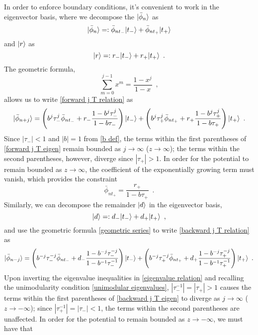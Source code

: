 \documentclass[submission, Phys]{SciPost}
\newcommand{\lp}{\left(}
\newcommand{\rp}{\right)}
\DeclarePairedDelimiter\ket{\lvert}{\rangle}
\begin{document}
In order to enforce boundary conditions, it's convenient to work in the eigenvector basis, where we decompose the $\ket{\bar\phi_n}$ as
\begin{equation}
    \label{eigen decomp phi}
    \ket{\bar\phi_n}=:\bar\phi_{n t_-}\ket{t_-} + \bar\phi_{nt_+}\ket{t_+}
\end{equation}
and $\ket r$ as
\begin{equation}
    \label{eigen decomp r}
    \ket r =: r_-\ket{t_-}+r_+\ket{t_+}
    \,\,\,.
\end{equation}
The geometric formula,
\begin{equation}
    \label{geometric series}
    \sum_{m=0}^{j-1} x^m = \frac{1-x^j}{1-x}
    \,\,\,,
\end{equation}
allows us to write \eqref{forward j T relation} as
\begin{equation}
    \label{forward j T eigen}
    \ket{\bar\phi_{n+j}} = 
    \lp 
    b^j \tau_-^j\bar\phi_{nt_-} + r_-\frac{1-b^j\tau_-^j}{1-b\tau_-}
    \rp\ket{t_-}
    +
    \lp
    b^j\tau_+^j\bar\phi_{nt_+}+r_+\frac{1-b^j\tau_+^j}{1-b\tau_+}
    \rp\ket{t_+}
    \,\,\,.
\end{equation}
Since $|\tau_-|<1$ and $|b|=1$ from \eqref{b def}, the terms within the first parentheses of \eqref{forward j T eigen} remain bounded as $j\to\infty$ ($z\to\infty$); the terms within the second parentheses, however, diverge since $|\tau_+|>1$.  In order for the potential to remain bounded as $z\to\infty$, the coefficient of the exponentially growing term must vanish, which provides the constraint
\begin{equation}
    \label{forward BC}
    \bar\phi_{nt_+}=\frac{r_+}{1-b\tau_+}
    \,\,\,.
\end{equation}
Similarly, we can decompose the remainder $\ket d$ in the eigenvector basis,
\begin{equation}
    \label{eigen decomp d}
    \ket d=:d_-\ket{t_-} + d_+\ket{t_+}
    \,\,\,,
\end{equation}
and use the geometric formula \eqref{geometric series} to write \eqref{backward j T relation} as
\begin{equation}
    \label{backward j T eigen}
    \ket{\bar\phi_{n-j}} = 
    \lp
    b^{-j}\tau_-^{-j}\bar\phi_{nt_-} + d_- \frac{1-b^{-j}\tau_-^{-j}}{1-b^{-1}\tau_-^{-1}}
    \rp
    \ket{t_-}
    +
    \lp
    b^{-j}\tau_+^{-j}\bar\phi_{nt_+}
    +
    d_+\frac{1-b^{-j}\tau_+^{-j}}{1-b^{-1}\tau_+^{-1}}
    \rp
    \ket{t_+}
    \,\,\,.
\end{equation}
Upon inverting the eigenvalue inequalities in \eqref{eigenvalue relation} and recalling the unimodularity condition \eqref{unimodular eigenvalues}, $|\tau_-^{-1}|=|\tau_+|>1$ causes the terms within the first parentheses of \eqref{backward j T eigen} to diverge as $j\to\infty$ ($z\to-\infty$); since $|\tau_+^{-1}|=|\tau_-|<1$, the terms within the second parentheses are unaffected.  In order for the potential to remain bounded as $z\to-\infty$, we must have that
\end{document}
